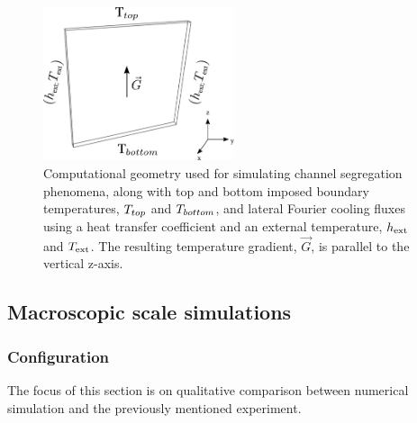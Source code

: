 \begin{figure}[htbp]
\centering
\includegraphics[width=0.5\textwidth]{Chapter4/Graphics/freckle_fe/config.pdf}
\captionsetup{singlelinecheck=off}
\caption[.]{Computational geometry used for simulating channel segregation phenomena, along with top and bottom imposed boundary temperatures, $T_{top}$
and $T_{bottom}$, and lateral Fourier cooling fluxes using a heat transfer coefficient and an external temperature, $h_{\text{ext}}$ and $T_{\text{ext}}$. 
The resulting temperature gradient, $\vec{G}$, is parallel to the vertical z-axis.}
\label{fig:freckle_simu_bc}
\end{figure}

\subsection{Macroscopic scale simulations}

\subsubsection{Configuration}

The focus of this section is on qualitative comparison between numerical simulation and the previously mentioned experiment. 

